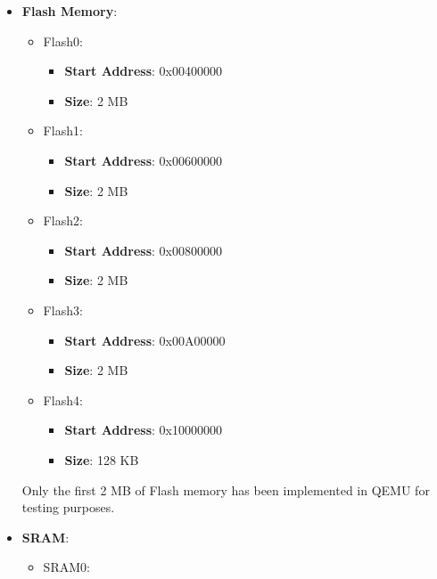 \begin{itemize}
    \item {\textbf{Flash Memory}:
        \begin{itemize}
            \item { Flash0:
                \begin{itemize}
                    \item \textbf{Start Address}: 0x00400000
                    \item \textbf{Size}: 2 MB
                \end{itemize}
            }
            \item { Flash1:
                \begin{itemize}
                    \item \textbf{Start Address}: 0x00600000
                    \item \textbf{Size}: 2 MB
                \end{itemize}
            }
            \item { Flash2:
                \begin{itemize}
                    \item \textbf{Start Address}: 0x00800000
                    \item \textbf{Size}: 2 MB
                \end{itemize}
            }
            \item { Flash3:
                \begin{itemize}
                    \item \textbf{Start Address}: 0x00A00000
                    \item \textbf{Size}: 2 MB
                \end{itemize}
            }
            \item { Flash4:
                \begin{itemize}
                    \item \textbf{Start Address}: 0x10000000
                    \item \textbf{Size}: 128 KB
                \end{itemize}
            }
        \end{itemize}
        Only the first 2 MB of Flash memory has been implemented in QEMU for testing purposes.
    }
    \item {\textbf{SRAM}:
        \begin{itemize}
            \item { SRAM0:
}
\end{itemize}}
\end{itemize}

